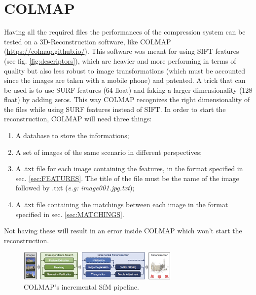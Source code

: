 
\section{COLMAP} \label{sec:COLMAP}
Having all the required files the performances of the compression system can be tested on a 3D-Reconstruction software, like COLMAP (\url{https://colmap.github.io/}). This software was meant for using SIFT features (see fig. \ref{fig:descriptors}), which are heavier and more performing in terms of quality but also less robust to image transformations (which must be accounted since the images are taken with a mobile phone) and patented. A trick that can be used is to use SURF features (64 float) and faking a larger dimensionality (128 float) by adding zeros. This way COLMAP recognizes the right dimensionality of the files while using SURF features instead of SIFT. In order to start the reconstruction, COLMAP will need three things:
\begin{enumerate}
\item A database to store the informations;
\item A set of images of the same scenario in different perspectives;
\item A .txt file for each image containing the features, in the format specified in sec. \ref{sec:FEATURES}. The title of the file must be the name of the image followed by .txt (\emph{e.g: image001.jpg.txt});
\item A .txt file containing the matchings between each image in the format specified in sec. \ref{sec:MATCHINGS}.
\end{enumerate}
Not having these will result in an error inside COLMAP which won't start the reconstruction.

\begin{figure}[h!]
    \centering
    \includegraphics[width=0.7\textwidth]{images/colmap.png}
    \caption{COLMAP’s incremental SfM pipeline.}
    \label{fig:colmap}    
\end{figure}